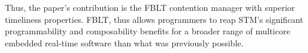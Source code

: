 \documentclass[conference]{IEEEtran}
\begin{document}
Thus, the paper's contribution is the FBLT contention manager with superior timeliness properties. FBLT, thus allows programmers to reap STM's significant programmability and composability benefits for a broader range of multicore embedded real-time software than what was previously possible.
%
\begin{comment}
\section{Related Work}
\label{sec:past}

Transactional-like concurrency control without using locks, for real-time systems, has been previously studied in the context of non-blocking data structures (e.g.,~\cite{anderson95realtime}). Despite their numerous advantages over locks 
(e.g., deadlock-freedom), 
their programmability has remained a challenge. 
Past studies show that they are best suited for simple data structures where their retry cost is competitive to the cost of lock-based synchronization~\cite{bc+08}.  In contrast, STM is semantically simpler~\cite{Herlihy:2006:AMP:1146381.1146382}, and is often the only viable lock-free solution for complex data structures (e.g., red/black tree)~\cite{key-1} and nested critical sections~\cite{Saha:2006:MHP:1122971.1123001}.

STM concurrency control for real-time systems has been previously studied in~\cite{manson2006preemptible,fahmy2009bounding,sarni2009real,schoeberl2010rttm,key-1,barrosmanaging,stmconcurrencycontrol:emsoft11,lcmdac2012,shambake_phd_proposal}.


\cite{manson2006preemptible} proposes a restricted version of STM for uniprocessors. Uniprocessors do not need contention management. \cite{fahmy2009bounding} bounds response times in distributed  systems with STM synchronization. They consider Pfair scheduling, limit to small atomic regions with fixed size, and limit transaction execution to span at most two quanta. In contrast, we allow transaction lengths with  arbitrary duration. 

\cite{sarni2009real} presents real-time scheduling of transactions and serializes transactions based on deadlines. However, the work does not bound retries and response times. In contrast, we establish such bounds. \cite{schoeberl2010rttm} proposes real-time HTM. The work does not describe how transactional conflicts are resolved. Besides, the retry bound assumes that the worst case conflict between atomic sections of different tasks occurs when the sections are released at the same time. However, we show that this is not the worst case. We develop retry and response time upper bounds based on much worse conditions.



\end{comment}
\end{document}

